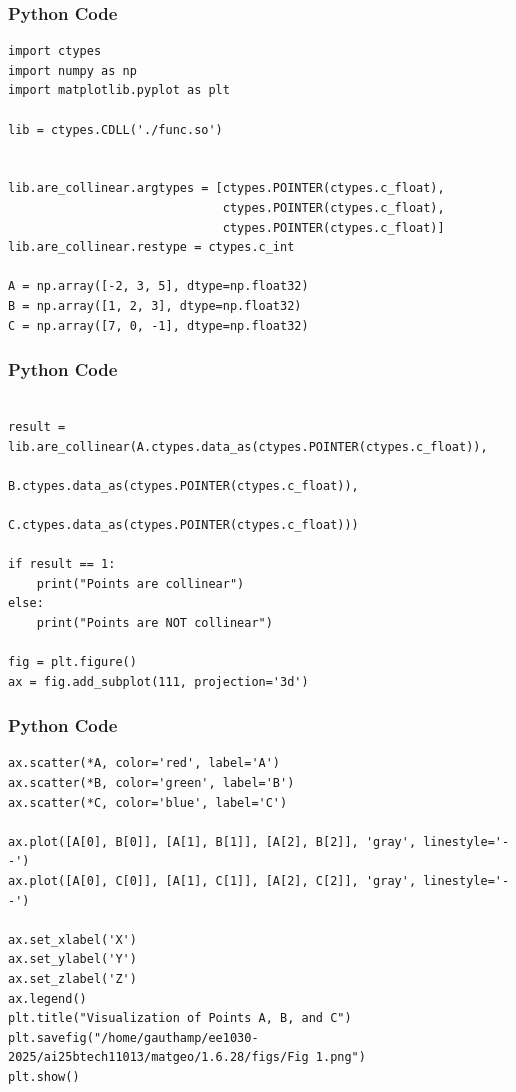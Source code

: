 \documentclass{beamer}
\begin{document}
\begin{frame}[fragile]
    \frametitle{Python Code}
    \begin{lstlisting}
import ctypes
import numpy as np
import matplotlib.pyplot as plt

lib = ctypes.CDLL('./func.so')


lib.are_collinear.argtypes = [ctypes.POINTER(ctypes.c_float),
                              ctypes.POINTER(ctypes.c_float),
                              ctypes.POINTER(ctypes.c_float)]
lib.are_collinear.restype = ctypes.c_int

A = np.array([-2, 3, 5], dtype=np.float32)
B = np.array([1, 2, 3], dtype=np.float32)
C = np.array([7, 0, -1], dtype=np.float32)
    \end{lstlisting}
\end{frame}

\begin{frame}[fragile]
    \frametitle{Python Code}
    \begin{lstlisting}

result = lib.are_collinear(A.ctypes.data_as(ctypes.POINTER(ctypes.c_float)),
                           B.ctypes.data_as(ctypes.POINTER(ctypes.c_float)),
                           C.ctypes.data_as(ctypes.POINTER(ctypes.c_float)))

if result == 1:
    print("Points are collinear")
else:
    print("Points are NOT collinear")

fig = plt.figure()
ax = fig.add_subplot(111, projection='3d')
    \end{lstlisting}
\end{frame}

\begin{frame}[fragile]
    \frametitle{Python Code}
    \begin{lstlisting}
ax.scatter(*A, color='red', label='A')
ax.scatter(*B, color='green', label='B')
ax.scatter(*C, color='blue', label='C')

ax.plot([A[0], B[0]], [A[1], B[1]], [A[2], B[2]], 'gray', linestyle='--')
ax.plot([A[0], C[0]], [A[1], C[1]], [A[2], C[2]], 'gray', linestyle='--')

ax.set_xlabel('X')
ax.set_ylabel('Y')
ax.set_zlabel('Z')
ax.legend()
plt.title("Visualization of Points A, B, and C")
plt.savefig("/home/gauthamp/ee1030-2025/ai25btech11013/matgeo/1.6.28/figs/Fig 1.png")
plt.show()
    \end{lstlisting}
\end{frame}
\end{document}
